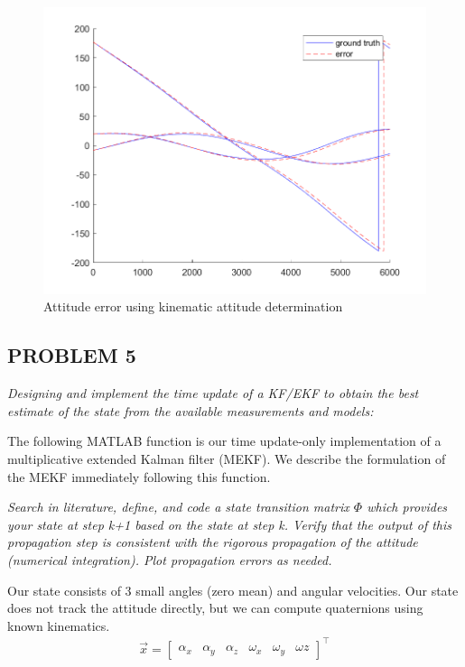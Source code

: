 \begin{figure}[H]
\centering
\includegraphics[scale=0.6]{Images/ps7_problem4_kin.png}
\caption{Attitude error using kinematic attitude determination}
\label{fig:ps7_problem4_kin}
\end{figure}

\subsection{PROBLEM 5}
\textit{Designing and implement the time update of a KF/EKF to obtain the best estimate of the state from the available measurements and models:}

The following MATLAB function is our time update-only implementation of a multiplicative extended Kalman filter (MEKF). We describe the formulation of the MEKF immediately following this function.



\textit{Search in literature, define, and code a state transition matrix $\Phi$ which provides your state at step k+1 based on the state at step k. Verify that the output of this propagation step is consistent with the rigorous propagation of the attitude (numerical integration). Plot propagation errors as needed.}

Our state consists of 3 small angles (zero mean) and angular velocities. Our state does not track the attitude directly, but we can compute quaternions using known kinematics.
\begin{align*}
    \Vec{x} = \begin{bmatrix}
        \alpha_{x} & \alpha_{y} & \alpha_{z} & \omega_{x} & \omega_{y} & \omega{z}
    \end{bmatrix}^{\intercal}
\end{align*}

